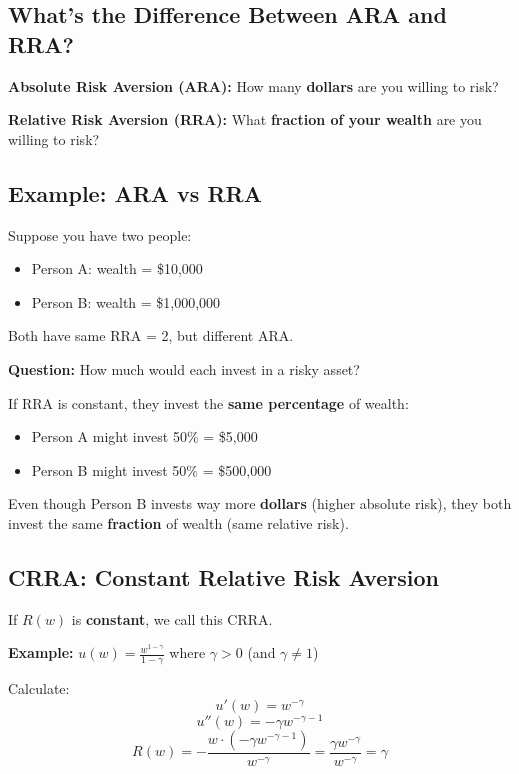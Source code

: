 \documentclass[12pt]{article}
\begin{document}
\subsection*{What's the Difference Between ARA and RRA?}

\textbf{Absolute Risk Aversion (ARA):} How many \textbf{dollars} are you willing to risk?

\textbf{Relative Risk Aversion (RRA):} What \textbf{fraction of your wealth} are you willing to risk?

\subsection*{Example: ARA vs RRA}

Suppose you have two people:
\begin{itemize}
    \item Person A: wealth = \$10,000
    \item Person B: wealth = \$1,000,000
\end{itemize}

Both have same RRA = 2, but different ARA.

\textbf{Question:} How much would each invest in a risky asset?

If RRA is constant, they invest the \textbf{same percentage} of wealth:
\begin{itemize}
    \item Person A might invest 50\% = \$5,000
    \item Person B might invest 50\% = \$500,000
\end{itemize}

Even though Person B invests way more \textbf{dollars} (higher absolute risk), they both invest the same \textbf{fraction} of wealth (same relative risk).

\subsection*{CRRA: Constant Relative Risk Aversion}

If $R(w)$ is \textbf{constant}, we call this CRRA.

\textbf{Example:} $u(w) = \frac{w^{1-\gamma}}{1-\gamma}$ where $\gamma > 0$ (and $\gamma \neq 1$)

Calculate:
$$u'(w) = w^{-\gamma}$$
$$u''(w) = -\gamma w^{-\gamma-1}$$
$$R(w) = -\frac{w \cdot (-\gamma w^{-\gamma-1})}{w^{-\gamma}} = \frac{\gamma w^{-\gamma}}{ w^{-\gamma}} = \gamma$$
\end{document}
